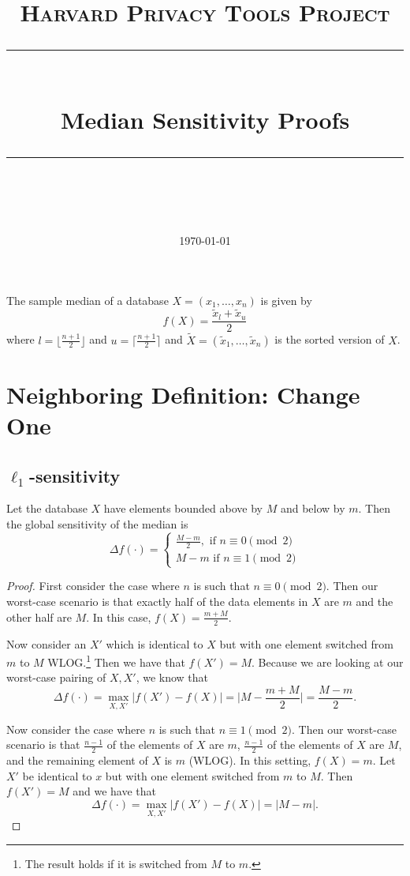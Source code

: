 \documentclass[11pt]{scrartcl} %
\title{
	\normalfont\normalsize
	\textsc{Harvard Privacy Tools Project}\\ %
	\vspace{25pt} %
	\rule{\linewidth}{0.5pt}\\ %
	\vspace{20pt} %
	{\huge Median Sensitivity Proofs}\\ %
	\vspace{12pt} %
	\rule{\linewidth}{2pt}\\ %
	\vspace{12pt} %
}
\date{\normalsize\today} %
\begin{document}
\maketitle

\begin{definition}
The sample median of a database $X = (x_1, \hdots, x_n)$ is given by
\[ f(X) = \frac{\tilde{x}_l + \tilde{x}_u}{2} \]
where $l = \lfloor \frac{n+1}{2} \rfloor$ and $u = \lceil \frac{n+1}{2} \rceil$ and
$\tilde{X} = (\tilde{x}_1, \hdots, \tilde{x}_n)$ is the sorted version of $X$.
\end{definition}

\section{Neighboring Definition: Change One}

\subsection{$\ell_1$-sensitivity}
\begin{theorem}
	Let the database $X$ have elements bounded above by $M$ and below by $m$.
	Then the global sensitivity of the median is
	\[
		\Delta f(\cdot) =
			\begin{cases}
				\frac{M - m}{2}, \text{ if } n \equiv 0 \pmod{2} \\
				M-m \text{ if } n \equiv 1 \pmod{2}
			\end{cases}
	\]
\end{theorem}

\begin{proof}
	First consider the case where $n$ is such that $n \equiv 0 \pmod{2}$. Then our worst-case scenario is that exactly
	half of the data elements in $X$ are $m$ and the other half are $M$. In this case,
	$f(X) = \frac{m + M}{2}$. \newline

	Now consider an $X'$ which is identical to $X$ but with one element switched from
	$m$ to $M$ WLOG.\footnote{The result holds if it is switched from $M$ to $m$.}
	Then we have that $f(X') = M$. Because we are looking at our worst-case pairing of $X,X'$,
	we know that
	\[ \Delta f(\cdot) = \max_{X,X'} |f(X') - f(X)| = \big\vert M - \frac{m+M}{2} \big\vert = \frac{M-m}{2}. \]

	Now consider the case where $n$ is such that $n \equiv 1 \pmod{2}$.
	Then our worst-case scenario is that $\frac{n-1}{2}$ of the elements of $X$ are $m$,
	$\frac{n-1}{2}$ of the elements of $X$ are $M$, and the remaining element of $X$ is $m$ (WLOG).
	In this setting, $f(X) = m$.
	Let $X'$ be identical to $x$ but with one element switched from $m$ to $M$.
	Then $f(X') = M$ and we have that
	\[ \Delta f(\cdot) = \max_{X,X'} |f(X') - f(X)| = |M - m|. \]
\end{proof}
\end{document}
